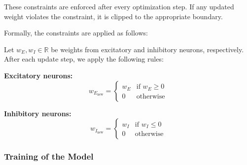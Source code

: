These constraints are enforced after every optimization step. If any updated weight violates the constraint, it is clipped to the appropriate boundary.

Formally, the constraints are applied as follows:

\begin{defn}
    Let $w_E, w_I \in \mathbb{R}$ be weights from excitatory and inhibitory neurons, respectively. After each update step, we apply the following rules:
    
    \textbf{Excitatory neurons:}
    \begin{equation*}
        w_{E_{\text{new}}} =
        \begin{cases}
            w_E & \text{if } w_E \geq 0 \\
            0 & \text{otherwise}
        \end{cases}
    \end{equation*}
    
    \textbf{Inhibitory neurons:}
    \begin{equation*}
        w_{I_{\text{new}}} =
        \begin{cases}
            w_I & \text{if } w_I \leq 0 \\
            0 & \text{otherwise}
        \end{cases}
    \end{equation*}
\end{defn}
\label{def:weight_constraints}


\subsubsection{Training of the Model}
\label{subsubsec:training_model}

